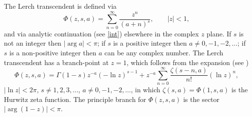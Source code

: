 \documentclass[pdftex]{sigma}
\numberwithin{equation}{section}
\begin{document}
The Lerch transcendent is defined via
\begin{equation}\label{Phi}
 \Phi(z,s,a)=\sum_{n=0}^{\infty}\frac{z^{n}}{(a+n)^{s}},
 \qquad |z|<1,
\end{equation}
and via analytic continuation (see \eqref{int}) elsewhere in the complex $z$ plane.
If $s$ is not an integer then $|\arg a|<\pi$; if $s$ is a positive integer then
$a\not= 0,-1,-2,\ldots$; if $s$ is a non-positive integer then $a$ can be any complex number.
The Lerch transcendent has a branch-point at $z=1$, which follows from the expansion
(see \cite[Section~1.11\,(8)]{Erdelyi:1953:HTF1})
\begin{equation*}%
 \Phi(z,s,a)=\Gamma(1-s) z^{-a} (-\ln z)^{s-1}+z^{-a}
 \sum_{n=0}^{\infty}\frac{\zeta(s-n,a)}{n!}(\ln z)^n,
\end{equation*}
$|\ln z|<2\pi$, $s\not=1,2,3,\ldots$, $a\not=0,-1,-2,\ldots$, in which
$\zeta(s,a)=\Phi(1,s,a)$ is the Hurwitz zeta function.
The principle branch for $\Phi(z,s,a)$ is the sector $|\arg (1-z)|<\pi$.
\end{document}
